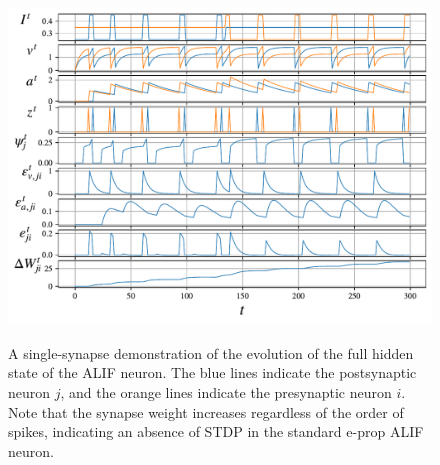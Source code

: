             \begin{figure}[!ht]
                \centering
                \includegraphics[width=\linewidth]{gfx/alif}
                \label{fig:alif}
                \caption[Single-synapse ALIF demo.]{A single-synapse demonstration of the evolution of the full hidden state of the ALIF neuron. The blue lines indicate the postsynaptic neuron $j$, and the orange lines indicate the presynaptic neuron $i$. Note that the synapse weight increases regardless of the order of spikes, indicating an absence of STDP in the standard e-prop ALIF neuron.}
            \end{figure}


